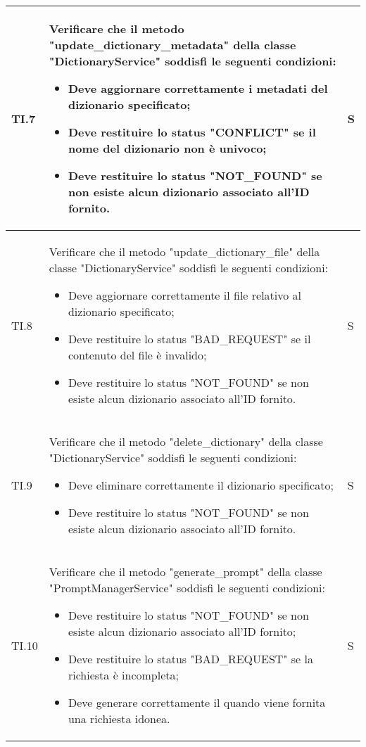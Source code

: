 \begin{adjustwidth}{-0.5cm}{-0.5cm}
\begin{longtable}{|P{1.5cm}|>{\raggedright}P{9.5cm}|>{\arraybackslash}P{1.5cm}|}
		\hline TI.7 & Verificare che il metodo "update\_dictionary\_metadata" della classe "DictionaryService" soddisfi le seguenti condizioni:
		\begin{itemize}
			\item Deve aggiornare correttamente i metadati del dizionario specificato;
			\item Deve restituire lo status "CONFLICT" se il nome del dizionario non è univoco;
			\item Deve restituire lo status "NOT\_FOUND" se non esiste alcun dizionario associato all'ID fornito.
		\end{itemize} & S \\

		\hline TI.8 & Verificare che il metodo "update\_dictionary\_file" della classe "DictionaryService" soddisfi le seguenti condizioni:
		\begin{itemize}
			\item Deve aggiornare correttamente il file relativo al dizionario specificato;
			\item Deve restituire lo status "BAD\_REQUEST" se il contenuto del file è invalido;
			\item Deve restituire lo status "NOT\_FOUND" se non esiste alcun dizionario associato all'ID fornito.
		\end{itemize} & S \\

		\hline TI.9 & Verificare che il metodo "delete\_dictionary" della classe "DictionaryService" soddisfi le seguenti condizioni:
		\begin{itemize}
			\item Deve eliminare correttamente il dizionario specificato;
			\item Deve restituire lo status "NOT\_FOUND" se non esiste alcun dizionario associato all'ID fornito.
		\end{itemize} & S \\

		\hline TI.10 & Verificare che il metodo "generate\_prompt" della classe "PromptManagerService" soddisfi le seguenti condizioni:
		\begin{itemize}
			\item Deve restituire lo status "NOT\_FOUND" se non esiste alcun dizionario associato all'ID fornito;
			\item Deve restituire lo status "BAD\_REQUEST" se la richiesta è incompleta;
			\item Deve generare correttamente il  quando viene fornita una richiesta idonea.
		\end{itemize} & S \\


\end{longtable}
\end{adjustwidth}
